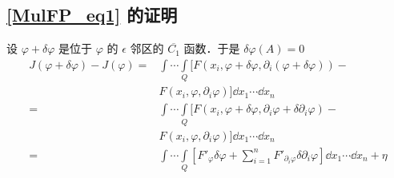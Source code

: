 \subsection{\autoref{MulFP_eq1} 的证明}
设 $\varphi+\delta\varphi$ 是位于 $\varphi$ 的 $\epsilon$ 邻区的 $\overline{C_1}$ 函数．于是 $\delta{\varphi}(A)=0$
\begin{equation}
\begin{aligned}
J(\varphi+\delta\varphi)-J(\varphi)=&\int\cdots\int\limits_Q [F(x_i,\varphi+\delta\varphi,\partial_i(\varphi+\delta\varphi))-\\
&F(x_i,\varphi,\partial_i\varphi)]\dd x_1\cdots\dd x_n\\
=&\int\cdots\int\limits_Q [F(x_i,\varphi+\delta\varphi,\partial_i\varphi+\delta\partial_i\varphi)-\\
&F(x_i,\varphi,\partial_i\varphi)]\dd x_1\cdots\dd x_n\\
=&\int\cdots\int\limits_Q [F'_\varphi\delta\varphi+\sum_{i=1}^nF'_{\partial_i\varphi}\delta\partial_i\varphi]\dd x_1\cdots\dd x_n+\eta
\end{aligned}
\end{equation}
